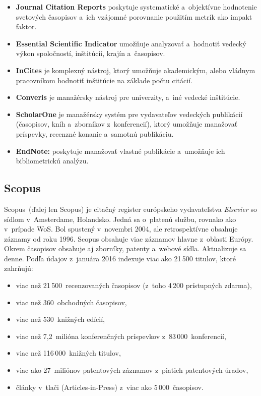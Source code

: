 \begin{itemize}
\item \textbf{Journal Citation Reports} poskytuje systematické a~objektívne
  hodnotenie svetových časopisov a~ich vzájomné porovnanie použitím metrík ako
  impakt faktor.
\item \textbf{Essential Scientific Indicator} umožňuje analyzovať a~hodnotiť
  vedecký výkon spoločností, inštitúcií, krajín a~časopisov.
\item \textbf{InCites} je komplexný nástroj, ktorý umožňuje akademickým, alebo
  vládnym pracovníkom hodnotiť inštitúcie na základe počtu citácií.
\item \textbf{Converis} je manažérsky nástroj pre univerzity, a~iné vedecké
  inštitúcie.
\item \textbf{ScholarOne} je manažérsky systém pre vydavateľov vedeckých
  publikácií (časopisov, kníh a~zborníkov z~konferencií), ktorý umožňuje
  manažovať príspevky, recenzné konanie a~samotnú publikáciu.
\item \textbf{EndNote:} poskytuje manažovať vlastné publikácie a~umožňuje ich
  bibliometrickú analýzu.
\end{itemize}


\subsection{Scopus}
\label{sec:scopus}

Scopus\R\ (ďalej len Scopus) je citačný register európskeho vydavateľstva \emph{Elsevier} so
sídlom v~Amsterdame, Holandsko.  Jedná sa o~platenú službu, rovnako ako v~prípade WoS.
Bol spustený v~novembri 2004, ale retrospektívne obsahuje záznamy od roku 1996.
Scopus obsahuje viac záznamov hlavne z~oblasti Európy.  Okrem časopisov obsahuje
aj zborníky, patenty a~webové sídla.  Aktualizuje sa denne.  Podľa údajov
z~januára 2016 indexuje viac ako 21\,500 titulov, ktoré zahrňujú:

\begin{itemize}
\item viac než 21\,500~recenzovaných časopisov (z~toho 4\,200 prístupných
  zdarma),
\item viac než 360~obchodných časopisov,
\item viac než 530~knižných edícií,
\item viac než 7,2~milióna konferenčných príspevkov z~83\,000~konferencií,
\item viac než 116\,000~knižných titulov,
\item viac ako 27~miliónov patentových záznamov z~piatich patentových úradov,
\item články v~tlači (Articles-in-Press) z~viac ako 5\,000~časopisov.
\end{itemize}

